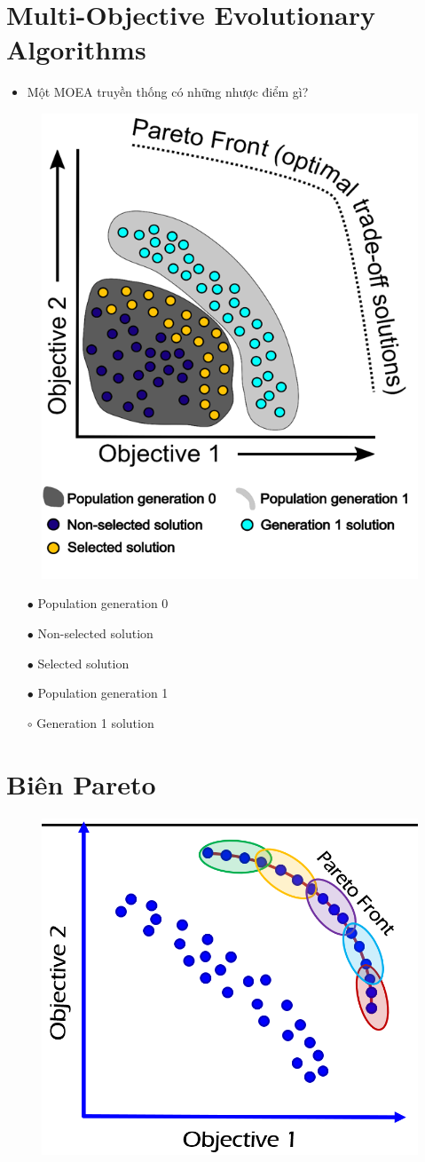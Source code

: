 \documentclass{book}
\begin{document}
\section*{Multi-Objective Evolutionary Algorithms}

\begin{itemize}
    \item Một MOEA truyền thống có những nhược điểm gì?
\end{itemize}

\begin{figure}[H]
    \centering
    \includegraphics[width=0.5\linewidth]{images/GA-7-8_53.png}
\end{figure}

\begin{itemize}
    \item[$\bullet$] Population generation 0
    \item[$\bullet$] Non-selected solution
    \item[$\bullet$] Selected solution
    \item[$\bullet$] Population generation 1
    \item[$\circ$] Generation 1 solution
\end{itemize}

\section{Biên Pareto}
\begin{figure}[H]
    \centering
    \includegraphics[width=0.5\linewidth]{images/GA-7-8_55.png}
\end{figure}
\end{document}
